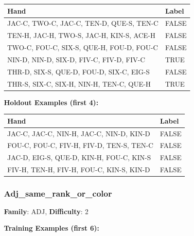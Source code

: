 \documentclass[10pt,a4paper]{article}
\begin{document}
\begin{small}
\begin{tabular}{p{8cm}l}
\toprule
Hand & Label \\
\midrule
JAC-C, TWO-C, JAC-C, TEN-D, QUE-S, TEN-C & \textcolor{negative}{FALSE} \\
TEN-H, JAC-H, TWO-S, JAC-H, KIN-S, ACE-H & \textcolor{negative}{FALSE} \\
TWO-C, FOU-C, SIX-S, QUE-H, FOU-D, FOU-C & \textcolor{negative}{FALSE} \\
NIN-D, NIN-D, SIX-D, FIV-C, FIV-D, FIV-C & \textcolor{positive}{TRUE} \\
THR-D, SIX-S, QUE-D, FOU-D, SIX-C, EIG-S & \textcolor{negative}{FALSE} \\
THR-S, SIX-C, SIX-H, NIN-H, TEN-C, QUE-H & \textcolor{positive}{TRUE} \\
\bottomrule
\end{tabular}
\end{small}

\textbf{Holdout Examples (first 4):}

\begin{small}
\begin{tabular}{p{8cm}l}
\toprule
Hand & Label \\
\midrule
JAC-C, JAC-C, NIN-H, JAC-C, NIN-D, KIN-D & \textcolor{negative}{FALSE} \\
FOU-C, FOU-C, FIV-H, FIV-D, TEN-S, TEN-C & \textcolor{negative}{FALSE} \\
JAC-D, EIG-S, QUE-D, KIN-H, FOU-C, KIN-S & \textcolor{negative}{FALSE} \\
FIV-H, TEN-H, FIV-H, FOU-C, KIN-S, KIN-D & \textcolor{negative}{FALSE} \\
\bottomrule
\end{tabular}
\end{small}

\vspace{0.5cm}

\subsubsection{Adj\_same\_rank\_or\_color}

\textbf{Family}: ADJ, \textbf{Difficulty}: 2

\textbf{Training Examples (first 6):}
\end{document}
